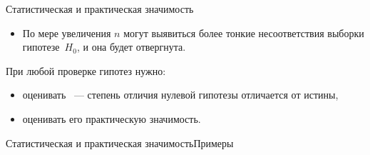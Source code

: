 \documentclass[11pt,pdf,utf8,hyperref={unicode},aspectratio=169]{beamer}
\begin{document}
\begin{frame}{Статистическая и практическая значимость}{}
\begin{itemize}
		\item По мере увеличения $n$ могут выявиться более тонкие несоответствия выборки гипотезе~$H_0$, и она будет отвергнута.
    \end{itemize}

	\bigskip

	\alert{При любой проверке гипотез нужно:}
    \begin{itemize}
        \item оценивать ~--- степень отличия нулевой гипотезы отличается от истины,
        \item оценивать его практическую значимость.
    \end{itemize}
\end{frame}
\begin{frame}{Статистическая и практическая значимость}{Примеры}

\end{frame}
\end{document}
